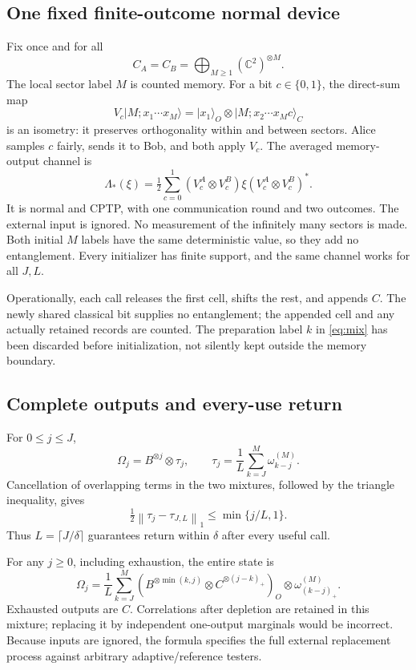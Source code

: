 \documentclass[11pt,a4paper]{article}
\numberwithin{equation}{section}
\theoremstyle{remark}
\newcommand{\normone}[1]{\left\|#1\right\|_1}
\newcommand{\ket}[1]{|#1\rangle}
\begin{document}
\subsection{One fixed finite-outcome normal device}
Fix once and for all
\[
 C_A=C_B=\bigoplus_{M\geq1}(\mathbb C^2)^{\otimes M}.
\]
The local sector label \(M\) is counted memory. For a bit \(c\in\{0,1\}\),
the direct-sum map
\[
 V_c\ket{M;x_1\cdots x_M}
    =\ket{x_1}_O\otimes\ket{M;x_2\cdots x_Mc}_C
\]
is an isometry: it preserves orthogonality within and between sectors.
Alice samples \(c\) fairly, sends it to Bob, and both apply \(V_c\).
The averaged memory-output channel is
\begin{equation}
 \Lambda_*(\xi)=\tfrac12\sum_{c=0}^1
 (V_c^A\otimes V_c^B)\xi(V_c^A\otimes V_c^B)^*. \label{eq:fixed-shift}
\end{equation}
It is normal and CPTP, with one communication round and two outcomes.
The external input is ignored. No measurement of the infinitely many
sectors is made. Both initial \(M\) labels have the same deterministic
value, so they add no entanglement. Every initializer has finite support,
and the same channel works for all \(J,L\).

Operationally, each call releases the first cell, shifts the rest, and
appends \(C\). The newly shared classical bit supplies no entanglement;
the appended cell and any actually retained records are counted.
The preparation label \(k\) in \eqref{eq:mix} has been discarded before
initialization, not silently kept outside the memory boundary.

\subsection{Complete outputs and every-use return}
For \(0\leq j\leq J\),
\[
 \Omega_j=B^{\otimes j}\otimes\tau_j,\qquad
 \tau_j=\frac1L\sum_{k=J}^{M}\omega_{k-j}^{(M)}.
\]
Cancellation of overlapping terms in the two mixtures, followed by the
triangle inequality, gives
\begin{equation}
 \tfrac12\normone{\tau_j-\tau_{J,L}}\leq\min\{j/L,1\}.
                                                        \label{eq:all-return}
\end{equation}
Thus \(L=\lceil J/\delta\rceil\) guarantees return within \(\delta\)
after every useful call.

For any \(j\geq0\), including exhaustion, the entire state is
\begin{equation}
 \Omega_j=\frac1L\sum_{k=J}^{M}
 \left(B^{\otimes\min(k,j)}\otimes C^{\otimes(j-k)_+}\right)_O
       \otimes\omega_{(k-j)_+}^{(M)}.             \label{eq:mix-full}
\end{equation}
Exhausted outputs are \(C\). Correlations after depletion are retained in
this mixture; replacing it by independent one-output marginals would be
incorrect. Because inputs are ignored, the formula specifies the full
external replacement process against arbitrary adaptive/reference testers.
\end{document}
